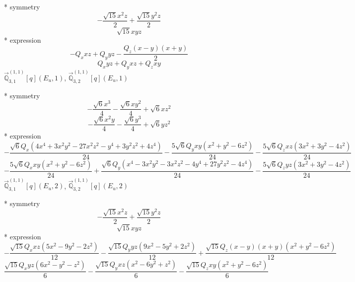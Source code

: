 \documentclass[fleqn,8pt]{jsarticle}
\begin{document}
\noindent\quad ** symmetry
\begin{dmath*}
- \frac{\sqrt{15} x^{2} z}{2} + \frac{\sqrt{15} y^{2} z}{2}
\end{dmath*}
\begin{dmath*}
\sqrt{15} x y z
\end{dmath*}
\noindent\quad ** expression
\begin{dmath*}
- Q_{x} x z + Q_{y} y z - \frac{Q_{z} \left(x - y\right) \left(x + y\right)}{2}
\end{dmath*}
\begin{dmath*}
Q_{x} y z + Q_{y} x z + Q_{z} x y
\end{dmath*}
\noindent\quad $\vec{\mathbb{Q}}_{3,1}^{(1,1)}[q](E_{u},1)$, $\vec{\mathbb{Q}}_{3,2}^{(1,1)}[q](E_{u},1)$

\noindent\quad ** symmetry
\begin{dmath*}
- \frac{\sqrt{6} x^{3}}{4} - \frac{\sqrt{6} x y^{2}}{4} + \sqrt{6} x z^{2}
\end{dmath*}
\begin{dmath*}
- \frac{\sqrt{6} x^{2} y}{4} - \frac{\sqrt{6} y^{3}}{4} + \sqrt{6} y z^{2}
\end{dmath*}
\noindent\quad ** expression
\begin{dmath*}
- \frac{\sqrt{6} Q_{x} \left(4 x^{4} + 3 x^{2} y^{2} - 27 x^{2} z^{2} - y^{4} + 3 y^{2} z^{2} + 4 z^{4}\right)}{24} - \frac{5 \sqrt{6} Q_{y} x y \left(x^{2} + y^{2} - 6 z^{2}\right)}{24} - \frac{5 \sqrt{6} Q_{z} x z \left(3 x^{2} + 3 y^{2} - 4 z^{2}\right)}{24}
\end{dmath*}
\begin{dmath*}
- \frac{5 \sqrt{6} Q_{x} x y \left(x^{2} + y^{2} - 6 z^{2}\right)}{24} + \frac{\sqrt{6} Q_{y} \left(x^{4} - 3 x^{2} y^{2} - 3 x^{2} z^{2} - 4 y^{4} + 27 y^{2} z^{2} - 4 z^{4}\right)}{24} - \frac{5 \sqrt{6} Q_{z} y z \left(3 x^{2} + 3 y^{2} - 4 z^{2}\right)}{24}
\end{dmath*}
\noindent\quad $\vec{\mathbb{Q}}_{3,1}^{(1,1)}[q](E_{u},2)$, $\vec{\mathbb{Q}}_{3,2}^{(1,1)}[q](E_{u},2)$

\noindent\quad ** symmetry
\begin{dmath*}
- \frac{\sqrt{15} x^{2} z}{2} + \frac{\sqrt{15} y^{2} z}{2}
\end{dmath*}
\begin{dmath*}
\sqrt{15} x y z
\end{dmath*}
\noindent\quad ** expression
\begin{dmath*}
- \frac{\sqrt{15} Q_{x} x z \left(5 x^{2} - 9 y^{2} - 2 z^{2}\right)}{12} - \frac{\sqrt{15} Q_{y} y z \left(9 x^{2} - 5 y^{2} + 2 z^{2}\right)}{12} + \frac{\sqrt{15} Q_{z} \left(x - y\right) \left(x + y\right) \left(x^{2} + y^{2} - 6 z^{2}\right)}{12}
\end{dmath*}
\begin{dmath*}
\frac{\sqrt{15} Q_{x} y z \left(6 x^{2} - y^{2} - z^{2}\right)}{6} - \frac{\sqrt{15} Q_{y} x z \left(x^{2} - 6 y^{2} + z^{2}\right)}{6} - \frac{\sqrt{15} Q_{z} x y \left(x^{2} + y^{2} - 6 z^{2}\right)}{6}
\end{dmath*}
\end{document}
